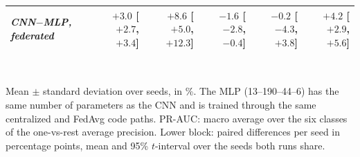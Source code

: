 \begin{table}[t]
\begin{tabular}{lrrrrrr}
\emph{CNN$-$MLP, federated} & & $+3.0$ [$+2.7$, $+3.4$] & $+8.6$ [$+5.0$, $+12.3$] & $-1.6$ [$-2.8$, $-0.4$] & $-0.2$ [$-4.3$, $+3.8$] & $+4.2$ [$+2.9$, $+5.6$] \\
\bottomrule
\end{tabular}
\\[2pt]
\parbox{\linewidth}{\scriptsize Mean $\pm$ standard deviation over seeds, in \%. The MLP (13--190--44--6) has the same number of parameters as the CNN and is trained through the same centralized and FedAvg code paths. PR-AUC: macro average over the six classes of the one-vs-rest average precision. Lower block: paired differences per seed in percentage points, mean and 95\% $t$-interval over the seeds both runs share.}
\end{table}
